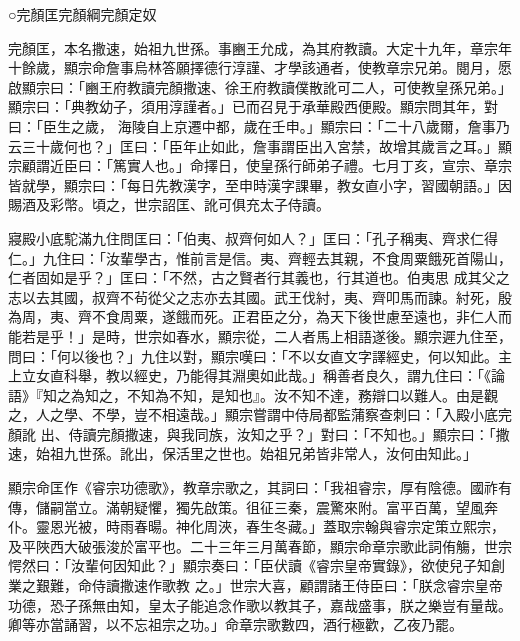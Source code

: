 
\begin{pinyinscope}

 ○完顏匡完顏綱完顏定奴



 完顏匡，本名撒速，始祖九世孫。事豳王允成，為其府教讀。大定十九年，章宗年十餘歲，顯宗命詹事烏林答願擇德行淳謹、才學該通者，使教章宗兄弟。閱月，愿啟顯宗曰：「豳王府教讀完顏撒速、徐王府教讀僕散訛可二人，可使教皇孫兄弟。」顯宗曰：「典教幼子，須用淳謹者。」已而召見于承華殿西便殿。顯宗問其年，對曰：「臣生之歲，
 海陵自上京遷中都，歲在壬申。」顯宗曰：「二十八歲爾，詹事乃云三十歲何也？」匡曰：「臣年止如此，詹事謂臣出入宮禁，故增其歲言之耳。」顯宗顧謂近臣曰：「篤實人也。」命擇日，使皇孫行師弟子禮。七月丁亥，宣宗、章宗皆就學，顯宗曰：「每日先教漢字，至申時漢字課畢，教女直小字，習國朝語。」因賜酒及彩幣。頃之，世宗詔匡、訛可俱充太子侍讀。



 寢殿小底駝滿九住問匡曰：「伯夷、叔齊何如人？」匡曰：「孔子稱夷、齊求仁得仁。」九住曰：「汝輩學古，惟前言是信。夷、齊輕去其親，不食周粟餓死首陽山，仁者固如是乎？」匡曰：「不然，古之賢者行其義也，行其道也。伯夷思
 成其父之志以去其國，叔齊不茍從父之志亦去其國。武王伐紂，夷、齊叩馬而諫。紂死，殷為周，夷、齊不食周粟，遂餓而死。正君臣之分，為天下後世慮至遠也，非仁人而能若是乎！」是時，世宗如春水，顯宗從，二人者馬上相語遂後。顯宗遲九住至，問曰：「何以後也？」九住以對，顯宗嘆曰：「不以女直文字譯經史，何以知此。主上立女直科舉，教以經史，乃能得其淵奧如此哉。」稱善者良久，謂九住曰：「《論語》『知之為知之，不知為不知，是知也』。汝不知不達，務辯口以難人。由是觀之，人之學、不學，豈不相遠哉。」顯宗嘗謂中侍局都監蒲察查刺曰：「入殿小底完顏訛
 出、侍讀完顏撒速，與我同族，汝知之乎？」對曰：「不知也。」顯宗曰：「撒速，始祖九世孫。訛出，保活里之世也。始祖兄弟皆非常人，汝何由知此。」



 顯宗命匡作《睿宗功德歌》，教章宗歌之，其詞曰：「我祖睿宗，厚有陰德。國祚有傳，儲嗣當立。滿朝疑懼，獨先啟策。徂征三秦，震驚來附。富平百萬，望風奔仆。靈恩光被，時雨春暘。神化周浹，春生冬藏。」蓋取宗翰與睿宗定策立熙宗，及平陜西大破張浚於富平也。二十三年三月萬春節，顯宗命章宗歌此詞侑觴，世宗愕然曰：「汝輩何因知此？」顯宗奏曰：「臣伏讀《睿宗皇帝實錄》，欲使兒子知創業之艱難，命侍讀撒速作歌教
 之。」世宗大喜，顧謂諸王侍臣曰：「朕念睿宗皇帝功德，恐子孫無由知，皇太子能追念作歌以教其子，嘉哉盛事，朕之樂豈有量哉。卿等亦當誦習，以不忘祖宗之功。」命章宗歌數四，酒行極歡，乙夜乃罷。




\end{pinyinscope}
